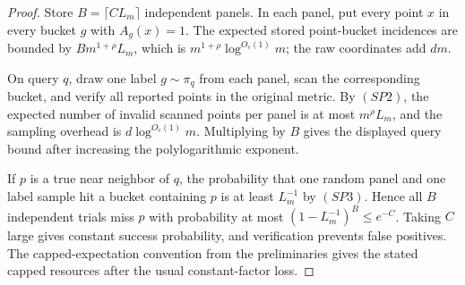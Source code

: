 \documentclass[10pt]{article}
\theoremstyle{definition}
\begin{document}
\begin{proof}
   Store \(B=\lceil C L_m\rceil\) independent panels.  In each panel, put
   every point \(x\) in every bucket \(g\) with \(A_g(x)=1\).  The expected
   stored point-bucket incidences are bounded by \(B m^{1+\rho}L_m\), which is
   \(m^{1+\rho}\log^{O_c(1)}m\); the raw coordinates add \(dm\).

   On query \(q\), draw one label \(g\sim\pi_q\) from each panel, scan the
   corresponding bucket, and verify all reported points in the original metric.
   By \((SP2)\), the expected number of invalid scanned points per panel is at
   most \(m^\rho L_m\), and the sampling overhead is
   \(d\log^{O_c(1)}m\).  Multiplying by \(B\) gives the displayed query bound
   after increasing the polylogarithmic exponent.

   If \(p\) is a true near neighbor of \(q\), the probability that one random
   panel and one label sample hit a bucket containing \(p\) is at least
   \(L_m^{-1}\) by \((SP3)\).  Hence all \(B\) independent trials miss \(p\)
   with probability at most \((1-L_m^{-1})^B\le e^{-C}\).  Taking \(C\) large
   gives constant success probability, and verification prevents false
   positives.  The capped-expectation convention from the preliminaries gives
   the stated capped resources after the usual constant-factor loss.
\end{proof}
\end{document}
